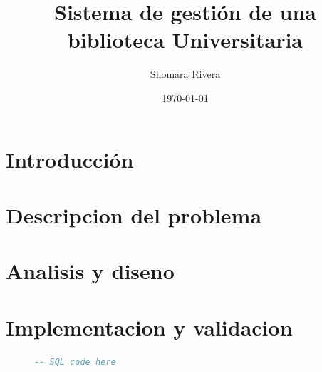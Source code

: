 \documentclass[10pt, letterpaper]{article}
\title{Sistema de gestión de una biblioteca Universitaria}
\author{Shomara Rivera}
\date{\today}
\begin{document}
\maketitle

\tableofcontents

\section{Introducción}

\section{Descripcion del problema}
\section{Analisis y diseno}
\section{Implementacion y validacion}
\begin{figure}
    \begin{lstlisting}[language=SQL]
    -- SQL code here
    \end{lstlisting}
\end{figure}
\end{document}
